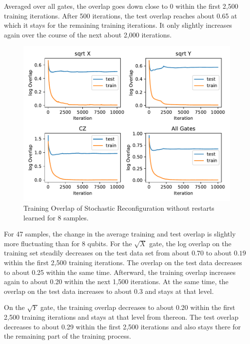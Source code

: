 Averaged over all gates, the overlap goes down close to 0 within the first 2,500 training iterations. 
After 500 iterations, the test 
overlap reaches about 0.65 at which it stays for the remaining training iterations. It only 
slightly increases again over the course of the next about 2,000 iterations.


\begin{figure}[H]
  \centering
  \includegraphics[width=\textwidth]{figures/results/SR-no-restarts-learned/avgOverlap_8.pdf}
  \caption[Training overlap of Stochastic Reconfiguration without restarts learned]{Training 
  Overlap of Stochastic Reconfiguration without restarts learned for 8 samples.}
  \label{fig:sr_no_restarts_overlap_8}
\end{figure}

For 47 samples, the change in the average training and test overlap is slightly more fluctuating than for 8 qubits. For the 
$\sqrt{X}$ gate, the log overlap on the training set steadily decreases on the test data set from 
about $0.70$ to about $0.19$ within the first 2,500 training iterations. The overlap on the test data 
decreases to about 0.25 within the same time. Afterward, the training overlap increases again to about 
0.20 within the next 1,500 iterations. At the same time, the overlap on the test data increases to about 
0.3 and stays at that level.

On the $\sqrt{Y}$ gate, the training overlap decreases to about 0.20 within the first 2,500 training iterations 
and stays at that level from thereon. The test overlap decreases to about 0.29 within the first 2,500 iterations 
and also stays there for the remaining part of the training process.

